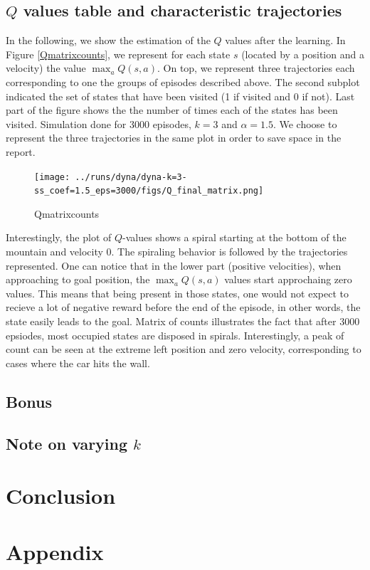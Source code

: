 \documentclass[a4paper, 12pt,oneside]{article}
\begin{document}
        \subsection{$Q$ values table and characteristic trajectories}
        In the following, we show the estimation of the $Q$ values after the learning. In Figure \ref{Qmatrixcounts}, we represent for each state $s$ (located by a position and a velocity) the value $\max_a Q(s,a)$. On top, we represent three trajectories each corresponding to one the groups of episodes described above. 
        The second subplot indicated the set of states that have been visited (1 if visited and 0 if not). Last part of the figure shows the the number of times each of the states has been visited. Simulation done for 3000 episodes, $k=3$ and $\alpha=1.5$.
        We choose to represent the three trajectories in the same plot in order to save space in the report.

        \begin{figure}[h]
            \centering
            \texttt{[image: ../runs/dyna/dyna-k=3-ss\_coef=1.5\_eps=3000/figs/Q\_final\_matrix.png]}
            \caption{Qmatrixcounts}
        \end{figure}

        Interestingly, the plot of $Q$-values shows a spiral starting at the bottom of the mountain and velocity 0. The spiraling behavior is followed by the trajectories represented. One can notice that in the lower part (positive velocities), when approaching to goal position, the $\max_a Q(s,a)$ values start approchaing zero values. This means that being present in those states, one would not expect to recieve a lot of negative reward before the end of the episode, in other words, the state easily leads to the goal.  
        Matrix of counts illustrates the fact that after 3000 epsiodes, most occupied states are disposed in spirals. Interestingly, a peak of count can be seen at the extreme left position and zero velocity, corresponding to cases where the car hits the wall. 

        

        \subsection{Bonus}
        \subsection{Note on varying $k$}

        \section{Conclusion}

        \section{Appendix}
\end{document}
